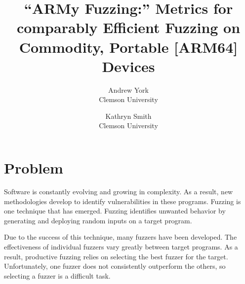 

\date{}

\title{\Large \bf “ARMy Fuzzing:” Metrics for comparably Efficient Fuzzing on Commodity, Portable [ARM64] Devices}

\author{
{\rm Andrew York}\\
Clemson University
\and
{\rm Kathryn Smith}\\
Clemson University
} %

\maketitle

\begin{comment} 
\begin{abstract}
Your abstract text goes here. Just a few facts. Whet our appetites.
Not more than 200 words, if possible, and preferably closer to 150.
\end{abstract}
\end{comment}

\section{Problem}


Software is constantly evolving and growing in complexity. As a result, new methodologies develop to identify vulnerabilities in these programs. Fuzzing is one technique that has emerged. Fuzzing identifies unwanted behavior by generating and deploying random inputs on a target program.

Due to the success of this technique, many fuzzers have been developed. The effectiveness of individual fuzzers vary greatly between target programs. As a result, productive fuzzing relies on selecting the best fuzzer for the target. Unfortunately, one fuzzer does not consistently outperform the others, so selecting a fuzzer is a difficult task.

